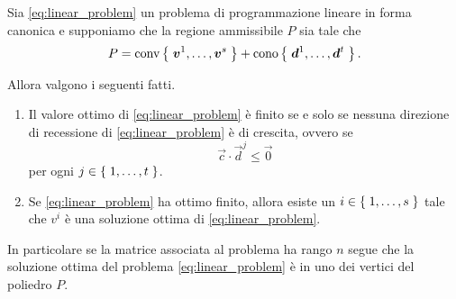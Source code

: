 \begin{theorem}
    Sia \eqref{eq:linear_problem} un problema di programmazione lineare in forma canonica e supponiamo che la regione ammissibile $P$ sia tale che \[
        P = \conv*{\vec v^1, \dots, \vec v^s} + \cono*{\vec d^1, \dots, \vec d^t}.  
    \]

    Allora valgono i seguenti fatti.
    \begin{enumerate}
        \item Il valore ottimo di \eqref*{eq:linear_problem} è finito se e solo se nessuna direzione di recessione di \eqref*{eq:linear_problem} è di crescita, ovvero se \[
            \vec c \cdot \vec d^j \leq \vec 0    
        \] per ogni $j \in \left\{\;1, \dots, t\;\right\}$.
        \item Se \eqref*{eq:linear_problem} ha ottimo finito, allora esiste un $i \in \left\{\;1, \dots, s\;\right\}$ tale che $v^i$ è una soluzione ottima di \eqref*{eq:linear_problem}.
    \end{enumerate}
\end{theorem}

In particolare se la matrice associata al problema ha rango $n$ segue che la soluzione ottima del problema \eqref*{eq:linear_problem} è in uno dei vertici del poliedro $P$.